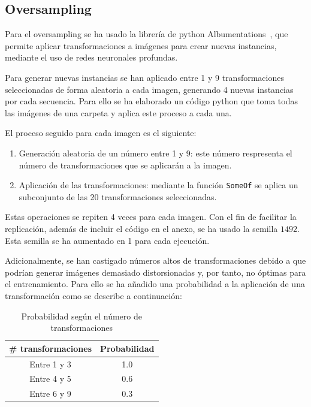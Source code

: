 \documentclass[12pt]{report} %
\begin{document}
    \subsection{Oversampling}

    Para el oversampling se ha usado la librería de python
    Albumentations~\cite{albumentations}, que permite aplicar transformaciones a imágenes
    para crear nuevas instancias, mediante el uso de redes neuronales profundas.
    
    Para generar nuevas instancias se han aplicado entre 1 y 9 transformaciones
    seleccionadas de forma aleatoria a cada imagen, generando 4
    nuevas instancias por cada secuencia. Para ello se ha elaborado un código
    python que toma todas las imágenes de una carpeta y aplica este proceso a
    cada una.

    El proceso seguido para cada imagen es el siguiente: 
    \begin{enumerate}
        \item Generación aleatoria de un número entre 1 y 9: este número respresenta el número de transformaciones que se aplicarán a la imagen.
        \item Aplicación de las transformaciones: mediante la función \texttt{SomeOf} se aplica un subconjunto de las 20 transformaciones seleccionadas.
    \end{enumerate}
    Estas operaciones se repiten 4 veces para cada imagen. Con el fin de
    facilitar la replicación, además de incluir el código en el anexo, se ha
    usado la semilla $1492$. Esta semilla se ha aumentado en 1 para cada
    ejecución.

    Adicionalmente, se han castigado números altos de transformaciones debido a
    que podrían generar imágenes demasiado distorsionadas y, por tanto, no
    óptimas para el entrenamiento. Para ello se ha añadido una probabilidad a
    la aplicación de una transformación como se describe a continuación:

    \begin{table}[H]
    \centering
        \begin{tabular}{cc}
        \toprule
        \textbf{\# transformaciones} & \textbf{Probabilidad} \\
        \midrule
        Entre 1 y 3 & 1.0\\
        Entre 4 y 5 & 0.6\\
        Entre 6 y 9 & 0.3\\
        \bottomrule
        \end{tabular}
    \caption{Probabilidad según el número de transformaciones}
    \end{table}
\end{document}
